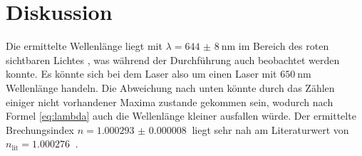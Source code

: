 
\section{Diskussion}
\label{sec:Diskussion}

Die ermittelte Wellenlänge liegt mit $\lambda = \SI{644(8)}{\nano\meter}$ im Bereich des roten sichtbaren Lichtes \cite{sichtbaresSpektrum}, was während der Durchführung auch beobachtet werden konnte. Es könnte sich bei dem Laser also um einen Laser mit $\SI{650}{\nano\meter}$ Wellenlänge handeln. Die Abweichung nach unten könnte durch das Zählen einiger nicht vorhandener Maxima zustande gekommen sein, wodurch nach Formel \eqref{eq:lambda} auch die Wellenlänge kleiner ausfallen würde. Der ermittelte Brechungsindex $n= \SI{1.000293(8)}{}$ liegt sehr nah am Literaturwert von $n_\text{lit}=\SI{1.000276}{}$ \cite{nLuft}.